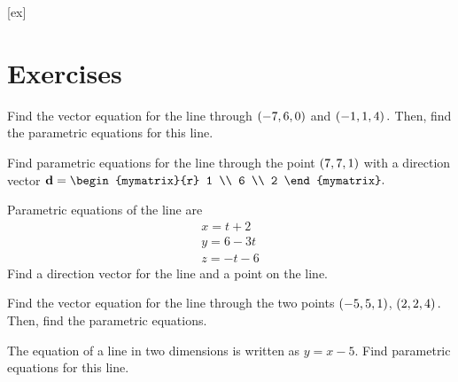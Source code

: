 [ex]
\section*{Exercises}

\begin{enumialphparenastyle}

\begin{ex} 
Find the vector equation for the line through $\left(
-7,6,0\right)$ and $\left(-1, 1 ,4 \right) .$  Then, find the parametric equations for this line. 
\end{ex}

\begin{ex} Find parametric equations for the line through the point $\left(7, 7, 1 \right) $ with a direction vector $\vect{d} = \begin{mymatrix}{r}
1 \\
6 \\
2
\end{mymatrix} .$ 
\end{ex} 

\begin{ex} Parametric equations of the line are 
\begin{equation*}
\begin{array}{c}
x = t+2 \\
y = 6-3t \\
z = -t-6
\end{array}
\end{equation*}
Find a direction vector for the line and a point on the line.
\end{ex} 


\begin{ex} Find the vector equation for the line through the two points $\left(
-5, 5, 1 \right) $, $\left(2, 2 , 4 \right) .$  Then, find the parametric equations. 
\end{ex} 

\begin{ex} The equation of a line in two dimensions is written as $y=x-5.$ Find
parametric equations for this line. 
\end{ex} 


\end{enumialphparenastyle}
